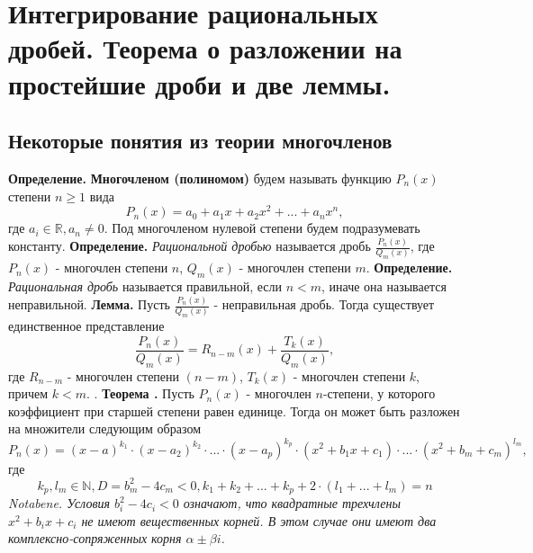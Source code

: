 \documentclass{article}
\newcommand*{\lemma}[1]{\textbf{Лемма.} #1. \newline}
\newcommand*{\theorem}[2]{\textbf{Теорема #1. } #2 \newline}
\newcommand*{\notabene}[1]{\textit{Notabene. #1.} \newline}
\newcommand*{\definition}[1]{\textbf{Определение.} #1 \newline}
\newcommand*{\p}[1][n]{P_{#1}(x)}
\newcommand*{\Q}[1][m]{Q_{#1}(x)}
\newcommand*{\Rfrac}[2]{\frac{\p{#1}}{\Q{#2}}}
\begin{document}
\section{Интегрирование рациональных дробей. Теорема о разложении на простейшие дроби и две леммы.}
\subsection{Некоторые понятия из теории многочленов}
\definition{\textbf{Многочленом (полиномом)} будем называть функцию $\p$ степени $n\geq1$ вида
$$
    \p = a_0 + a_1x + a_2x^2 + ... + a_nx^n,
$$
где $a_i \in \mathbb{R}, a_n \neq 0$. Под многочленом нулевой степени будем подразумевать константу.
}
\definition{\textit{Рациональной дробью} называется дробь $\Rfrac{}{}$, где $\p$ - многочлен степени $n$, $\Q{}$ - многочлен степени $m$.}
\definition{\textit{Рациональная дробь} называется правильной, если $n < m$, иначе она называется неправильной.}
\lemma{Пусть $\Rfrac{}{}$ - неправильная дробь. Тогда существует единственное представление 
$$
    \Rfrac{}{} = R_{n - m}(x) + \frac{T_k(x)}{Q_m(x)},
$$
где $R_{n - m}$ - многочлен степени $(n - m)$, $T_k(x)$ - многочлен степени $k$, причем $k < m$.
}
\theorem{}{Пусть $\p$ - многочлен $n$-степени, у которого коэффициент при старшей степени равен единице. Тогда он может быть разложен на множители следующим образом
$$
    \p = (x - a)^{k_1} \cdot (x-a_2)^{k_2}\cdot...\cdot (x - a_p)^{k_p} \cdot (x^2 + b_1x + c_1) \cdot ... \cdot (x^2 + b_m+c_m)^{l_m},
$$
где
$$
    k_p, l_m \in \mathbb{N}, D = b_m^2 - 4c_m < 0, k_1 + k_2 + ... + k_p + 2 \cdot (l_1 + ... + l_m) = n
$$
}
\notabene{Условия $b_i^2 - 4c_i < 0$ означают, что квадратные трехчлены $x^2 + b_ix + c_i$ не имеют вещественных корней. В этом случае они имеют два комплексно-сопряженных корня $\alpha \pm \beta i$}
\end{document}
